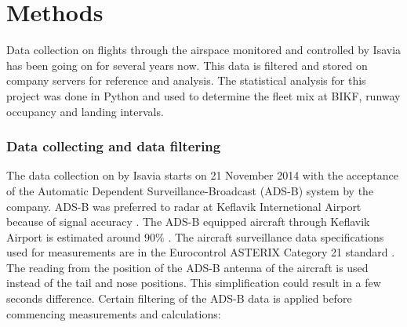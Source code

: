 \chapter{Methods\label{cha:methods}}
Data collection on flights through the airspace monitored and controlled by Isavia has been going on for several years now. This data is filtered and stored on company servers for reference and analysis. The statistical analysis for this project was done in Python and used to determine the fleet mix at BIKF, runway occupancy and landing intervals.

\subsection{Data collecting and data filtering}
The data collection on by Isavia starts on 21 November 2014 with the acceptance of the Automatic Dependent Surveillance-Broadcast (ADS-B) system by the company. ADS-B was preferred to radar at Keflavik Internetional Airport because of signal accuracy \cite{isavia_wiki}. The ADS-B equipped aircraft through Keflavik Airport is estimated around $90\%$ \cite{isavia-rounardeild_rannsoknir_2018}. The aircraft surveillance data specifications used for measurements are in the Eurocontrol ASTERIX Category 21 standard \cite{ASTERIX_ADS-B_specs}.
The reading from the position of the ADS-B antenna of the aircraft is used instead of the tail and nose positions. This simplification could result in a few seconds difference. Certain filtering of the ADS-B data is applied before commencing measurements and calculations: 
